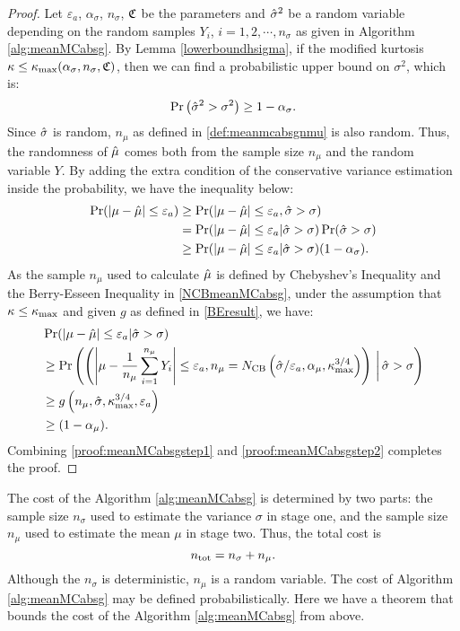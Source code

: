 \documentclass{iitthesis}
\theoremstyle{definition}
\begin{document}
\begin{proof}
Let $\varepsilon_a$, $\alpha_\sigma$, $n_\sigma$, $\mathfrak{C}$ be the parameters and $\hat{\sigma}^2$ be a random variable depending on the random samples $Y_i$, $i = 1,2,\cdots, n_{\sigma}$ as given in Algorithm \ref{alg:meanMCabsg}. By Lemma \ref{lowerboundhsigma}, if the modified kurtosis $\kappa \leq \kappa_{\max}(\alpha_{\sigma},n_{\sigma},\mathfrak{C})$, then we can find a probabilistic upper bound on $\sigma^2$, which is:
$$\Pr \left(\hat{\sigma}^2 > \sigma^2\right)\geq 1-\alpha_{\sigma}.$$
Since $\hat{\sigma}$ is random, $n_\mu$ as defined in \eqref{def:meanmcabsgnmu} is also random. Thus, the randomness of $\hat{\mu}$ comes both from the sample size $n_\mu$ and the random variable $Y$. By adding the extra condition of the conservative variance estimation inside the probability, we have the inequality below:
\begin{align}
\Pr(\left \lvert \mu-\hat{\mu} \right \rvert \leq \varepsilon_a) &\geq  \Pr({\left \lvert \mu-\hat{\mu} \right \rvert \leq \varepsilon_a}, {\hat{\sigma} >\sigma}) \nonumber \\
&= \Pr(\left \lvert \mu-\hat{\mu} \right \rvert \leq \varepsilon_a |\hat{\sigma}>\sigma)\Pr(\hat{\sigma} >\sigma) \nonumber \\
&\geq \Pr(\left \lvert \mu-\hat{\mu} \right \rvert \leq \varepsilon_a |\hat{\sigma} > \sigma)(1-\alpha_\sigma)\label{proof:meanMCabsgstep1}.
\end{align}
As the sample $n_\mu$ used to calculate $\hat{\mu}$ is defined by Chebyshev's Inequality and the Berry-Esseen Inequality in \eqref{NCBmeanMCabsg}, under the assumption that $\kappa \leq \kappa_{\max}$ and given $g$ as defined in \eqref{BEresult}, we have:
\begin{align}
&\Pr(\left \lvert \mu-\hat{\mu} \right \rvert \leq \varepsilon_a|\hat{\sigma}>\sigma) \nonumber \\& \geq \Pr\left( \left({\left \lvert \mu-\frac{1}{n_\mu}\sum_{i=1}^{n_\mu} Y_i \right \rvert \leq \varepsilon_a},{n_\mu= N_{\text{CB}}\left(\hat{\sigma}/\varepsilon_a,\alpha_\mu, \kappa_{\max}^{3/4}\right)}\right)\,\bigg\vert \,\hat{\sigma}>\sigma\right) \nonumber \\&\geq g\left(n_\mu,\hat{\sigma}, \kappa_{\max}^{3/4}, \varepsilon_a\right) \nonumber  \\&\geq (1-\alpha_\mu) \label{proof:meanMCabsgstep2}.
\end{align}
Combining \eqref{proof:meanMCabsgstep1} and \eqref{proof:meanMCabsgstep2} completes the proof.
\end{proof}

\label{sec:meanMCabsgcost}

The cost of the Algorithm \ref{alg:meanMCabsg} is determined by two parts: the sample size $n_{\sigma}$ used to estimate the variance $\sigma$ in stage one, and the sample size $n_\mu$ used to estimate the mean $\mu$ in stage two. Thus, the total cost is 
$$n_{\operatorname{tot}} = n_\sigma+n_\mu.$$
Although the $n_\sigma$ is deterministic, $n_\mu$ is a random variable. The cost of Algorithm \ref{alg:meanMCabsg} may be defined probabilistically. Here we have a theorem that bounds the cost of the Algorithm \ref{alg:meanMCabsg} from above.
\end{document}

